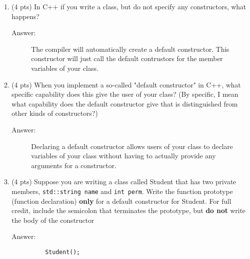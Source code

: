 \documentclass[11pt]{article}
\begin{document}
\begin{enumerate}
\item (4 pts) In C++ if you write a class, but do not specify any
constructors, what happens?

\begin{description}
  \item[Answer:] The compiler will automatically create a default constructor. This constructor will just call the default contrustors for the member variables of your class.
\end{description}

\vspace{4em}
\item (4 pts) When you implement a so-called "default constructor" in
C++, what specific capability does this give the user of your
class? (By specific, I mean what capability does the default
constructor give that is distinguished from other kinds of
constructors?)

\begin{description}
  \item[Answer:] Declaring a default constructor allows users of your class to declare variables of your class without having to actually provide any arguments for a constructor.
\end{description}

\vspace{4em}
\item (4 pts) Suppose you are writing a class called Student that has
two private members, \texttt{std::string name} and \texttt{int perm}. Write the
function prototype (function declaration) \textbf{only} for a default
constructor for Student. For full credit, include the semicolon
that terminates the prototype, but \textbf{do not} write the body of the
constructor

\begin{description}
  \item[Answer:] 
  \begin{verbatim}
    Student();
  \end{verbatim}
\end{description}

\vspace{4em}
\end{enumerate}

\section{}
\label{sec:org2b12c8a}
\end{document}
